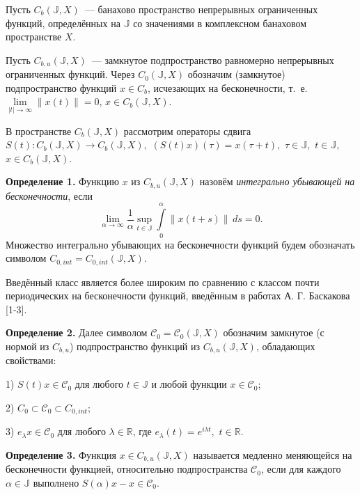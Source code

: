 


\vzmscaption

\vspace{-0.2em}
Пусть $C_b(\mathbb{J},X)$~--- банахово пространство непрерывных ограниченных функций,
определённых на $\mathbb{J}$ со значениями в комплексном банаховом пространстве $X$.

Пусть $C_{b,u}(\mathbb{J},X)$~--- замкнутое подпространство равномерно непрерывных ограниченных функций. Через $C_0(\mathbb{J},X)$ обозначим (замкнутое) подпространство функций $x\in C_b$,
 исчезающих на бесконечности, т.~е. $\lim\limits_{|t|\rightarrow\infty}\|x(t)\|=0$, $x\in C_b(\mathbb{J},X)$.

В пространстве $C_{b}(\mathbb{J},X)$ рассмотрим операторы сдвига $S(t):C_{b}(\mathbb{J},X)\rightarrow C_{b}(\mathbb{J},X),$ $(S(t)x)(\tau) = x(\tau + t),$ $\tau\in\mathbb{J},$ $t\in\mathbb{J},$ $x\in C_{b}(\mathbb{J},X)$.


\textbf{Определение 1.} Функцию  $x$ из $C_{b,u}(\mathbb{J},X)$ назовём \emph{интегрально убывающей на бесконечности},
если
\vspace{-0.2em}
$$
\lim\limits_{\alpha\rightarrow\infty}\frac{1}{\alpha}\sup\limits_{t\in\mathbb{J}}\int\limits_0^{\alpha}\|x(t+s)\|\,ds=0.
$$
\vspace{-0.2em}
Множество интегрально убывающих на бесконечности фун\-к\-ций будем обозначать символом $C_{0,int}=C_{0,int}(\mathbb{J},X)$.

Введённый класс является более широким по сравнению с
классом почти периодических на бесконечности функций, введённым в работах А. Г.
Баскакова [1-3].

\textbf{Определение 2.} Далее символом $\mathcal{C}_0=\mathcal{C}_0(\mathbb{J},X)$ обозначим замкнутое (с нормой из $C_{b,u}$) подпространство функций из $C_{b,u}(\mathbb{J},X)$, обладающих свойствами:

1) $S(t)x\in \mathcal{C}_0$ для любого $t\in\mathbb{J}$ и любой функции $x\in\mathcal{C}_0$;

2) $C_0 \subset \mathcal{C}_0 \subset C_{0,int}$;

3) $e_{\lambda}x \in \mathcal{C}_0$ для любого $\lambda\in\mathbb{R}$, где $e_{\lambda}(t)=e^{i\lambda t},$ $t\in\mathbb{R}$.


\textbf{Определение 3.}
Функция $x\in C_{b,u}(\mathbb{J},X)$ называется медленно
меняющейся на бесконечности функцией, относительно подпространства $\mathcal{C}_0$,
если для каждого $\alpha \in \mathbb{J}$ выполнено $S(\alpha)x-x\in \mathcal{C}_{0}$.



